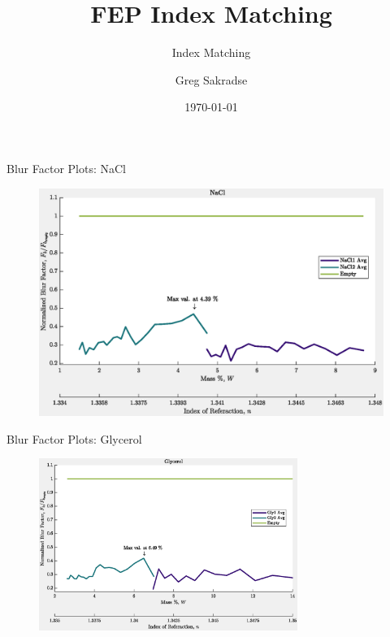 \documentclass[10pt]{beamer}
\title{FEP Index Matching}
\subtitle{Index Matching}
\date{\today}
\author{Greg Sakradse}
\begin{document}
\begin{frame}{Blur Factor Plots: NaCl}
\begin{figure}
    \centering
    \includegraphics[width = 0.75 \textwidth]{figs/NaCl_BlurPlot.eps}
    \label{NaClBlur}
\end{figure}
    
\end{frame}

\begin{frame}{Blur Factor Plots: Glycerol}
\begin{figure}
    \centering
    \includegraphics[width = 0.75\textwidth]{figs/Gly_BlurPlot.eps}
    \label{GlyBlur}
\end{figure}
    
\end{frame}
\end{document}
